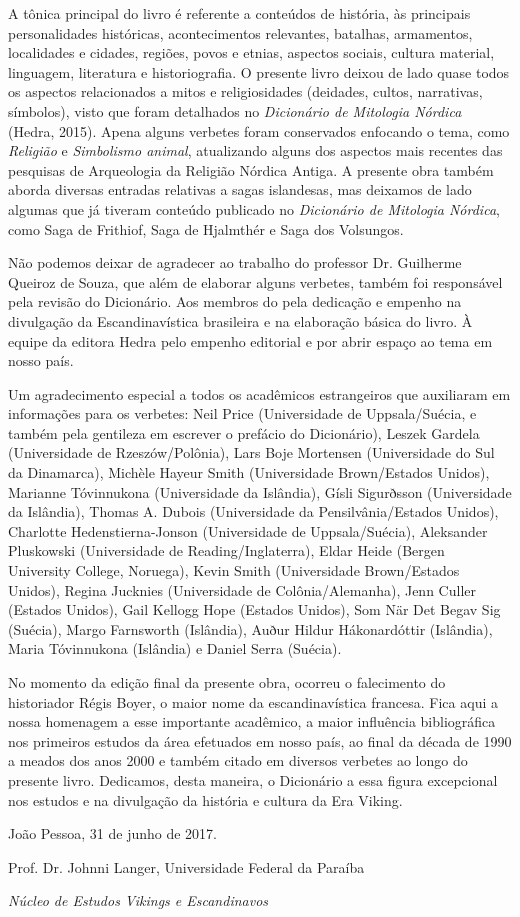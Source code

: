 A tônica principal do livro é referente a conteúdos de história, às
principais personalidades históricas, acontecimentos relevantes,
batalhas, armamentos, localidades e cidades, regiões, povos e etnias,
aspectos sociais, cultura material, linguagem, literatura e
historiografia. O presente livro deixou de lado quase todos os aspectos
relacionados a mitos e religiosidades (deidades, cultos, narrativas,
símbolos), visto que foram detalhados no \emph{Dicionário de Mitologia
Nórdica} (Hedra, 2015). Apena alguns verbetes foram conservados
enfocando o tema, como \emph{Religião} e \emph{Simbolismo animal},
atualizando alguns dos aspectos mais recentes das pesquisas de
Arqueologia da Religião Nórdica Antiga. A presente obra também aborda
diversas entradas relativas a sagas islandesas, mas deixamos de lado
algumas que já tiveram conteúdo publicado no \emph{Dicionário de
Mitologia Nórdica}, como Saga de Frithiof, Saga de Hjalmthér e Saga dos
Volsungos.

Não podemos deixar de agradecer ao trabalho do professor Dr. Guilherme
Queiroz de Souza, que além de elaborar alguns verbetes, também foi
responsável pela revisão do Dicionário. Aos membros do  pela
dedicação e empenho na divulgação da Escandinavística brasileira e na
elaboração básica do livro. À equipe da editora Hedra pelo empenho
editorial e por abrir espaço ao tema em nosso país.

Um agradecimento especial a todos os acadêmicos estrangeiros que
auxiliaram em informações para os verbetes: Neil Price (Universidade de
Uppsala/Suécia, e também pela gentileza em escrever o prefácio do
Dicionário), Leszek Gardela (Universidade de Rzeszów/Polônia), Lars Boje
Mortensen (Universidade do Sul da Dinamarca), Michèle Hayeur Smith
(Universidade Brown/Estados Unidos), Marianne Tóvinnukona (Universidade
da Islândia), Gísli Sigurðsson (Universidade da Islândia), Thomas A.
Dubois (Universidade da Pensilvânia/Estados Unidos), Charlotte
Hedenstierna-Jonson (Universidade de Uppsala/Suécia), Aleksander
Pluskowski (Universidade de Reading/Inglaterra), Eldar Heide (Bergen
University College, Noruega), Kevin Smith (Universidade Brown/Estados
Unidos), Regina Jucknies (Universidade de Colônia/Alemanha), Jenn Culler
(Estados Unidos), Gail Kellogg Hope (Estados Unidos), Som När Det Begav
Sig (Suécia), Margo Farnsworth (Islândia), Auður Hildur Hákonardóttir
(Islândia), Maria Tóvinnukona (Islândia) e Daniel Serra (Suécia).

No momento da edição final da presente obra, ocorreu o falecimento do
historiador Régis Boyer, o maior nome da escandinavística francesa. Fica
aqui a nossa homenagem a esse importante acadêmico, a maior influência
bibliográfica nos primeiros estudos da área efetuados em nosso país, ao
final da década de 1990 a meados dos anos 2000 e também citado em
diversos verbetes ao longo do presente livro. Dedicamos, desta maneira,
o Dicionário a essa figura excepcional nos estudos e na divulgação da
história e cultura da Era Viking.\medskip

\hfill João Pessoa, 31 de junho de 2017.

\hfill Prof. Dr. Johnni Langer, Universidade Federal da Paraíba

\hfill \emph{Núcleo de Estudos Vikings e Escandinavos}
